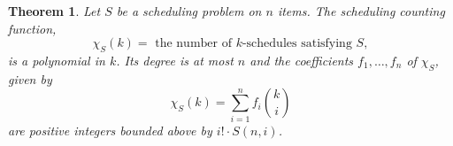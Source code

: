 \documentclass[12pt,reqno]{amsart}
\numberwithin{definition}{section}
\newtheorem{theorem}[definition]{Theorem}
\theoremstyle{definition}
\newcommand{\ZZ}{\mathbb{Z}}
\newcommand{\SSS}{\mathcal{S}}
\newcommand{\ehr}{\operatorname{ehr}}
\newcommand{\ncM}{\mathcal{M}}
\newcommand{\poly}{\chi} %
\begin{document}
\begin{theorem}
\label{fbasis}
Let $S$ be a scheduling problem on $n$ items.
The scheduling counting function,
 $$\poly_S(k) = \textrm{ the number of $k$-schedules satisfying $S$}, $$ is a polynomial in $k$.
  Its degree is at most $n$ and the coefficients $f_1,\ldots,f_n$ of $\poly_S$, given by
\[
  \poly_S(k) = \sum_{i=1}^n f_i\binom{k}{i}
\]
are positive integers bounded above by $i!\cdot S(n,i)$.


\end{theorem}
\end{document}
